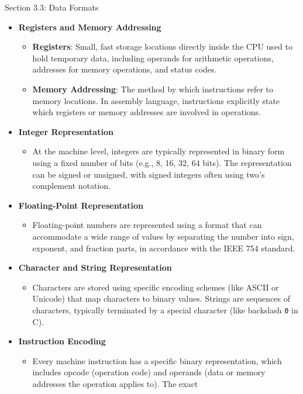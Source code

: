 \begin{notes}{Section 3.3: Data Formats}
    \begin{itemize}
        \item \textbf{Registers and Memory Addressing}
        \begin{itemize}
            \item \textbf{Registers}: Small, fast storage locations directly inside the CPU used to hold temporary data, including operands for arithmetic operations, addresses for memory operations, 
            and status codes.
            \item \textbf{Memory Addressing}: The method by which instructions refer to memory locations. In assembly language, instructions explicitly state which registers or memory addresses are 
            involved in operations.
        \end{itemize}
        \item \textbf{Integer Representation}
        \begin{itemize}
            \item At the machine level, integers are typically represented in binary form using a fixed number of bits (e.g., 8, 16, 32, 64 bits). The representation can be signed or unsigned, with 
            signed integers often using two's complement notation.
        \end{itemize}
        \item \textbf{Floating-Point Representation}
        \begin{itemize}
            \item Floating-point numbers are represented using a format that can accommodate a wide range of values by separating the number into sign, exponent, and fraction parts, in accordance with 
            the IEEE 754 standard.
        \end{itemize}
        \item \textbf{Character and String Representation}
        \begin{itemize}
            \item Characters are stored using specific encoding schemes (like ASCII or Unicode) that map characters to binary values. Strings are sequences of characters, typically terminated by a 
            special character (like backslash \texttt{0} in C).
        \end{itemize}
        \item \textbf{Instruction Encoding}
        \begin{itemize}
            \item Every machine instruction has a specific binary representation, which includes opcode (operation code) and operands (data or memory addresses the operation applies to). The exact 

\end{itemize}
\end{itemize}
\end{notes}
